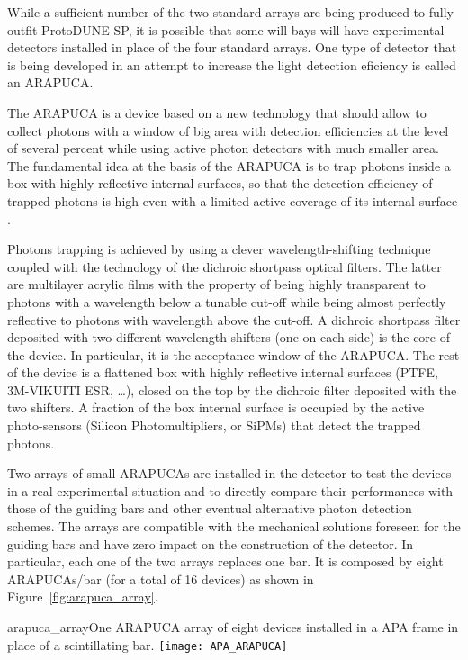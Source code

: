 While a sufficient number of the two standard arrays are being produced to fully outfit ProtoDUNE-SP, it is possible that some will bays will have experimental detectors installed in place 
of the four standard arrays. One type of detector that is being developed in an attempt to increase the light detection eficiency is called an ARAPUCA.

The ARAPUCA is a device based on a new technology that should allow to collect photons with a window of big area with detection efficiencies at the level of several percent while using 
active photon detectors with much smaller area.
The fundamental idea at the basis of the ARAPUCA is to trap photons inside a box with highly reflective internal surfaces, so that the detection efficiency of trapped photons is high even with a  limited active coverage of its internal surface \cite{arapuca_jinst}.

Photons trapping is achieved by using a clever wavelength-shifting technique coupled with the technology of the dichroic shortpass optical filters. The latter are multilayer acrylic films 
with the  property of being highly transparent to photons with a wavelength below a tunable cut-off while being almost perfectly reflective to photons with wavelength above the cut-off. 
A dichroic shortpass filter deposited with two different wavelength shifters (one on each side) is the core of the device. In particular, it is the acceptance window of the 
ARAPUCA. The rest of the device is a flattened box with highly reflective internal surfaces (PTFE, 3M-VIKUITI ESR, \dots), closed on the top by the 
dichroic  filter deposited with the two shifters. A fraction of the box internal surface is occupied by the active photo-sensors (Silicon Photomultipliers, or SiPMs) that detect the trapped photons.

Two arrays of small ARAPUCAs are installed in the detector %
to test the devices in a real experimental situation and to directly compare their performances with those of the guiding 
bars and other eventual alternative photon detection schemes. 
The arrays are compatible with the mechanical solutions foreseen for the guiding bars and have zero impact on the construction of the detector. In particular, each one of the two 
arrays replaces one bar. It is composed by eight ARAPUCAs/bar (for a total of 16 devices)  as shown in Figure~\ref{fig:arapuca_array}.
\begin{cdrfigure}
  {arapuca_array}{One ARAPUCA array of eight devices installed in a APA frame in place of a scintillating bar.}
\texttt{[image: APA\_ARAPUCA]}
\end{cdrfigure}

